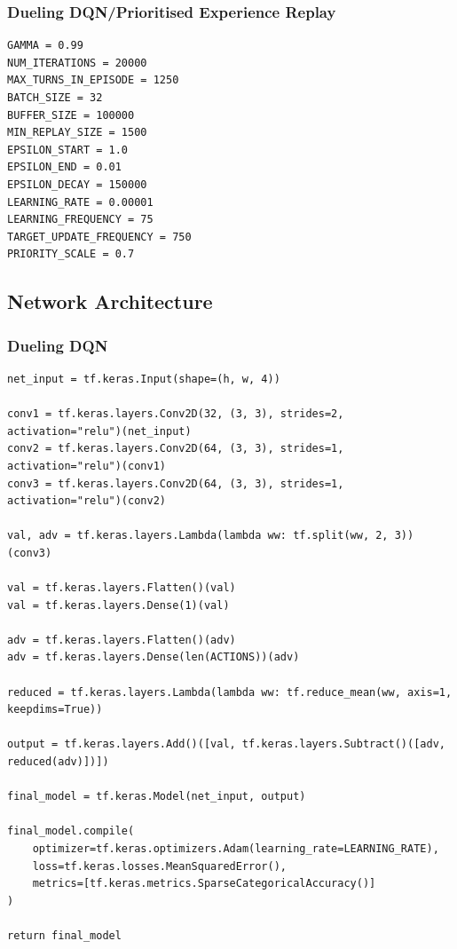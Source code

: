 \documentclass[12pt,a4paper]{article}
\begin{document}
    \subsubsection{Dueling DQN/Prioritised Experience Replay}
    \begin{lstlisting}[label={lst:ddqnperhyperparameters}]
GAMMA = 0.99
NUM_ITERATIONS = 20000
MAX_TURNS_IN_EPISODE = 1250
BATCH_SIZE = 32
BUFFER_SIZE = 100000
MIN_REPLAY_SIZE = 1500
EPSILON_START = 1.0
EPSILON_END = 0.01
EPSILON_DECAY = 150000
LEARNING_RATE = 0.00001
LEARNING_FREQUENCY = 75
TARGET_UPDATE_FREQUENCY = 750
PRIORITY_SCALE = 0.7
    \end{lstlisting}


    \subsection{Network Architecture}\label{subsec:network-architecture}
    \subsubsection{Dueling DQN}
    \begin{lstlisting}[label={lst:dueling}]
net_input = tf.keras.Input(shape=(h, w, 4))

conv1 = tf.keras.layers.Conv2D(32, (3, 3), strides=2, activation="relu")(net_input)
conv2 = tf.keras.layers.Conv2D(64, (3, 3), strides=1, activation="relu")(conv1)
conv3 = tf.keras.layers.Conv2D(64, (3, 3), strides=1, activation="relu")(conv2)

val, adv = tf.keras.layers.Lambda(lambda ww: tf.split(ww, 2, 3))(conv3)

val = tf.keras.layers.Flatten()(val)
val = tf.keras.layers.Dense(1)(val)

adv = tf.keras.layers.Flatten()(adv)
adv = tf.keras.layers.Dense(len(ACTIONS))(adv)

reduced = tf.keras.layers.Lambda(lambda ww: tf.reduce_mean(ww, axis=1, keepdims=True))

output = tf.keras.layers.Add()([val, tf.keras.layers.Subtract()([adv, reduced(adv)])])

final_model = tf.keras.Model(net_input, output)

final_model.compile(
    optimizer=tf.keras.optimizers.Adam(learning_rate=LEARNING_RATE),
    loss=tf.keras.losses.MeanSquaredError(),
    metrics=[tf.keras.metrics.SparseCategoricalAccuracy()]
)

return final_model
    \end{lstlisting}
\end{document}
